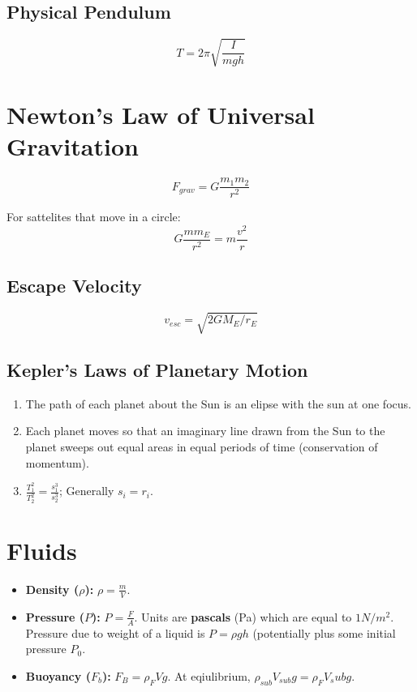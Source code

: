 \documentclass{article}
\begin{document}
\subsection{Physical Pendulum}
\begin{equation}
  T = 2 \pi \sqrt{\frac{I}{mgh}}
\end{equation}

\section{Newton's Law of Universal Gravitation}
\begin{equation}
  F_{grav} = G \frac{m_1 m_2}{r^2}
\end{equation}

For sattelites that move in a circle:
\begin{equation}
  G \frac{m m_E}{r^2} = m \frac{v^2}{r}
\end{equation}

\subsection{Escape Velocity}
\begin{equation}
  v_{esc} = \sqrt{2GM_E/r_E}
\end{equation}


\subsection{Kepler's Laws of Planetary Motion}
\begin{enumerate}
  \item The path of each planet about the Sun is an elipse with the sun at one focus.
  \item Each planet moves so that an imaginary line drawn from the Sun to the planet sweeps out equal areas in equal periods of time (conservation of momentum).
  \item $\frac{T_1^2}{T_2^2} = \frac{s_1^3}{s_2^3}$; Generally $s_i = r_i$.
\end{enumerate}

\section{Fluids}
\begin{itemize}
  \item \textbf{Density ($\rho$):} $\rho = \frac{m}{V}$.
  \item \textbf{Pressure ($P$):} $P = \frac{F}{A}$. Units are \textbf{pascals} (Pa) which are equal to $1 N/m^2$. Pressure due to weight of a liquid is $P = \rho gh$ (potentially plus some initial pressure $P_0$.
  \item \textbf{Buoyancy ($F_b$):} $F_B = \rho_F V g$. At eqiulibrium, $\rho_{sub} V_{sub} g = \rho_F V_sub g$.
\end{itemize}
\end{document}
